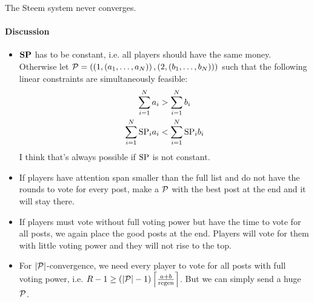 \begin{theorem}
  The Steem system never converges.
\end{theorem}

  \paragraph{Discussion}
    \begin{itemize}
      \item $\stpowvec$ has to be constant, i.e. all players should have the
      same money. Otherwise let $\postlist = \left(\left(1, \left(a_1, \dots,
      a_\playerlen\right)\right), \left(2, \left(b_1, \dots,
      b_\playerlen\right)\right)\right)$ such that the following linear
      constraints are simultaneously feasible:
      \begin{gather*}
        \sum\limits_{i=1}^\playerlen a_i > \sum\limits_{i=1}^\playerlen b_i \\
        \sum\limits_{i=1}^\playerlen \stpow_i a_i < \sum\limits_{i=1}^\playerlen
        \stpow_i  b_i \\
      \end{gather*}
      I think that's always possible if $\stpow$ is not constant.
      \item If players have attention span smaller than the full list and do not
      have the rounds to vote for every post, make a $\postlist$ with the best
      post at the end and it will stay there.
      \item If players must vote without full voting power but have the time to
      vote for all posts, we again place the good posts at the end. Players will
      vote for them with little voting power and they will not rise to the top.
      \item For $|\postlist|$-convergence, we need every player to vote for all
      posts with full voting power, i.e. $\rounds - 1 \geq \left(|\postlist| -
      1\right) \ceil*{\frac{a + b}{\regen}}$. But we can simply send a huge
      $\postlist$.
    \end{itemize}
